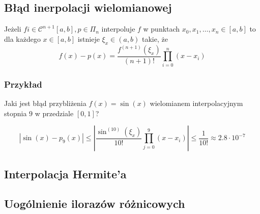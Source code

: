 \documentclass[../mn-notatki.tex]{subfiles}
\begin{document}
\subsection{Błąd inerpolacji wielomianowej}
\begin{tcolorbox}
Jeżeli $f i\in \mathcal{C}^{n+1}[a,b], p \in \Pi_n$ interpoluje $f$ w punktach
$x_0, x_1, \ldots, x_n \in [a,b]$ to dla każdego $x \in [a,b]$ istnieje
$\xi_x \in (a,b)$ takie, że
\[
f(x) - p(x) = \frac{f^{(n+1)}(\xi_x)}{(n+1)!} \prod_{i=0}^{n} (x-x_i)
\]
\end{tcolorbox}

\subsubsection{Przykład}

Jaki jest błąd przybliżenia $f(x) = \sin(x)$ wielomianem interpolacyjnym
stopnia $9$ w przedziale $[0,1]$?

\[
|\sin(x) - p_9(x)| \leqslant
\left| \frac{\sin^{(10)}(\xi_x)}{10!} \prod_{j=0}^{9} (x-x_i) \right|
\leqslant \frac{1}{10!} \approx 2.8 \cdot 10^{-7}
\]

\subsection{Interpolacja Hermite'a}
\subsection{Uogólnienie ilorazów różnicowych}


\pagebreak
\end{document}
